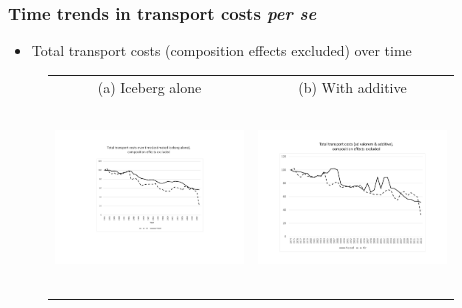 \documentclass[10 pt,Helvetica, french]{beamer}
\begin{document}
\begin{frame}
\frametitle{Time trends in transport costs \textit{per se}}
\begin{itemize}
\item Total transport costs (composition effects excluded) over time
\end{itemize}
\begin{figure}[htbp]
\begin{center}
\begin{tabular}{cc}
{\scriptsize (a) Iceberg alone } & {\scriptsize  (b) With additive }\\
\includegraphics[width=5cm, height=5cm]{Fig3a_TC_overtime_comp_effects_excl.pdf}
& \includegraphics[width=5cm,height=5cm]{TC_addplusmult_compeffects_excl.pdf} \\
\end{tabular}
\end{center}
\end{figure}

\end{frame}
\end{document}
